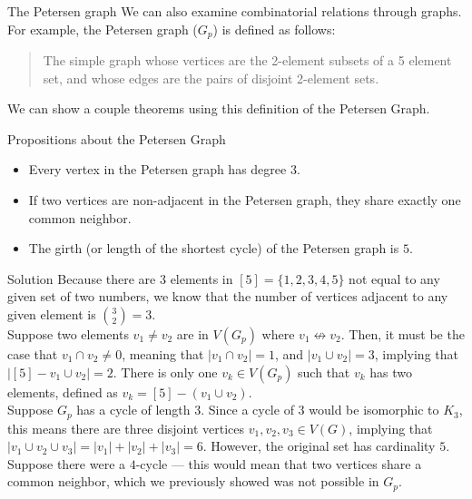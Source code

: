 \documentclass[10pt]{extarticle}
\begin{document}
\begin{problem}{The Petersen graph}
  We can also examine combinatorial relations through graphs. For example, the Petersen graph ($G_p$) is defined as follows:
  \begin{quote}
    The simple graph whose vertices are the 2-element subsets of a 5 element set, and whose edges are the pairs of disjoint 2-element sets.
  \end{quote}
  \begin{center}
  \end{center}
  We can show a couple theorems using this definition of the Petersen Graph.
  \begin{problem}{Propositions about the Petersen Graph}
    \begin{itemize}
      \item Every vertex in the Petersen graph has degree 3.
      \item If two vertices are non-adjacent in the Petersen graph, they share exactly one common neighbor.
      \item The girth (or length of the shortest cycle) of the Petersen graph is $5$.
    \end{itemize}
  \end{problem}
  \begin{problem}{Solution}
    Because there are $3$ elements in $[5] = \{1,2,3,4,5\}$ not equal to any given set of two numbers, we know that the number of vertices adjacent to any given element is ${3\choose 2} = 3$.\\ 

    Suppose two elements $v_1\neq v_2$ are in $V(G_p)$ where $v_1\not\leftrightarrow v_2$. Then, it must be the case that $v_1\cap v_2\neq 0$, meaning that $|v_1\cap v_2| = 1$, and $|v_1\cup v_2| = 3$, implying that $|[5] - v_1\cup v_2| = 2$. There is only one $v_k\in V(G_p)$ such that $v_k$ has two elements, defined as $v_k = [5] - (v_1\cup v_2)$.\\

    Suppose $G_p$ has a cycle of length $3$. Since a cycle of $3$ would be isomorphic to $K_3$, this means there are three disjoint vertices $v_1,v_2,v_3\in V(G)$, implying that $|v_1 \cup v_2 \cup v_3| = |v_1| + |v_2| + |v_3| = 6$. However, the original set has cardinality $5$. Suppose there were a $4$-cycle --- this would mean that two vertices share a common neighbor, which we previously showed was not possible in $G_p$.
  \end{problem}
\end{problem}
\end{document}
